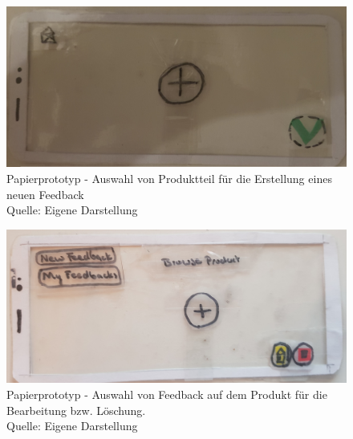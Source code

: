 \begin{figure}[H]
	\centering
	\includegraphics[width=.7\textwidth]{resources/conception/lowfi_create.jpg}
	\caption{Papierprototyp - Auswahl von Produktteil für die Erstellung eines neuen Feedback \\Quelle: Eigene Darstellung}
	\label{img:sysstem_sketch}
\end{figure}

\begin{figure}[H]
	\centering
	\includegraphics[width=.7\textwidth]{resources/conception/lowfi_edit_delete.jpg}
	\caption{Papierprototyp - Auswahl von Feedback auf dem Produkt für die Bearbeitung bzw. Löschung. \\Quelle: Eigene Darstellung}
	\label{img:sysstem_sketch}
\end{figure}

